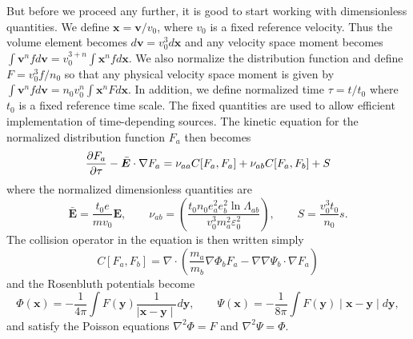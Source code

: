\documentclass[reprint]{revtex4}
\begin{document}
But before we proceed any further, it is good to start working with dimensionless quantities. We define $\bm{x}=\bm{v}/v_0$, where $v_0$ is a fixed reference velocity. Thus the volume element becomes $d\bm{v}=v_0^3d\bm{x}$ and any velocity space moment becomes $\int \bm{v}^n fd\bm{v}=v_0^{3+n}\int \bm{x}^nf d\bm{x}$. We also normalize the distribution function and define $F=v_0^3f/n_0$ so that any physical velocity space moment is given by $\int \bm{v}^n fd\bm{v}=n_0v_0^{n}\int \bm{x}^nF d\bm{x}$. In addition, we define normalized time $\tau=t/t_0$ where $t_0$ is a fixed reference time scale. The fixed quantities are used to allow efficient implementation of time-depending sources. The kinetic equation for the normalized distribution function $F_a$ then becomes
\begin{equation}
\frac{\partial F_a}{\partial\tau}-\bar{\bm{E}}\cdot\nabla F_a\\=\nu_{aa} C[F_a,F_a]+\nu_{ab} C[F_a,F_b]+S
\end{equation}
where the normalized dimensionless quantities are
\begin{equation}
\bar{\bm{E}}=\frac{t_0e}{mv_0}\bm{E},\qquad \nu_{ab}=\left(\frac{t_0n_0e_a^2e_b^2\ln\Lambda_{ab}}{v_0^3m_a^2\varepsilon_0^2}\right),\qquad S=\frac{v_0^3t_0}{n_0}s.
\end{equation}
The collision operator in the equation is then written simply
\begin{equation}
C[F_a,F_b]=\nabla\cdot\left(\frac{m_a}{m_b}\nabla\Phi_b F_a-\nabla\nabla\Psi_b\cdot\nabla F_a\right)
\end{equation}
and the Rosenbluth potentials become
\begin{equation}
\Phi(\bm{x})=-\frac{1}{4\pi}\int F(\bm{y})\frac{1}{\mid \bm{x}-\bm{y}\mid}d\bm{y},\qquad \Psi(\bm{x})=-\frac{1}{8\pi}\int F(\bm{y})\mid \bm{x}-\bm{y}\mid d\bm{y},
\end{equation}
and satisfy the Poisson equations $\nabla^2\Phi = F$ and $\nabla^2\Psi =\Phi$.
\end{document}
